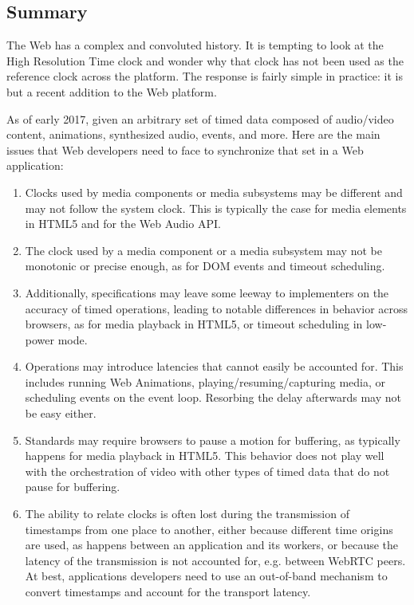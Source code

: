\subsection{Summary}

The Web has a complex and convoluted history. It is tempting to look at the
High Resolution Time clock and wonder why that clock has not been used as the
reference clock across the platform. The response is fairly simple in
practice: it is but a recent addition to the Web platform.

As of early 2017, given an arbitrary set of timed data composed of
audio/video content, animations, synthesized audio, events, and more. Here are
the main issues that Web developers need to face to synchronize that set in a
Web application:


\begin{enumerate}

\item{
Clocks used by media components or media subsystems may be different and may
not follow the system clock. This is typically the case for media elements in
HTML5 and for the Web Audio API.
}

\item{
The clock used by a media component or a media subsystem may not be monotonic
or precise enough, as for DOM events and timeout scheduling.
}

\item{
Additionally, specifications may leave some leeway to implementers on the
accuracy of timed operations, leading to notable differences in behavior
across browsers, as for media playback in HTML5, or timeout scheduling in 
low-power mode.
}

\item{
Operations may introduce latencies that cannot easily be accounted for. This
includes running Web Animations, playing/resuming/capturing media, or
scheduling events on the event loop. Resorbing the delay afterwards may not be
easy either.
}

\item{
Standards may require browsers to pause a motion for buffering, as typically
happens for media playback in HTML5. This behavior does not play well with the
orchestration of video with other types of timed data that do not pause for
buffering.
}

\item{ The ability to relate clocks is often lost during the transmission of
timestamps from one place to another, either because different time origins
are used, as happens between an application and its workers, or because the
latency of the transmission is not accounted for, e.g. between WebRTC peers.
At best, applications developers need to use an out-of-band mechanism to
convert timestamps and account for the transport latency. }


\end{enumerate}
